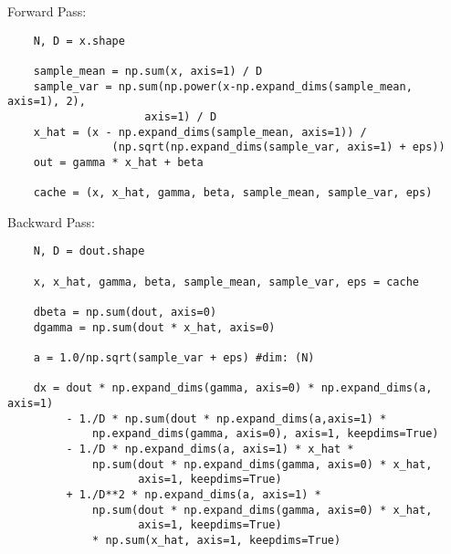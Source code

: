\documentclass[12pt,letter]{article}
\begin{document}
\begin{enumerate}
  \pagebreak

  Forward Pass:
\begin{verbatim}
    N, D = x.shape

    sample_mean = np.sum(x, axis=1) / D
    sample_var = np.sum(np.power(x-np.expand_dims(sample_mean, axis=1), 2),
                     axis=1) / D
    x_hat = (x - np.expand_dims(sample_mean, axis=1)) / 
                (np.sqrt(np.expand_dims(sample_var, axis=1) + eps))
    out = gamma * x_hat + beta

    cache = (x, x_hat, gamma, beta, sample_mean, sample_var, eps)
\end{verbatim}
  Backward Pass:
\begin{verbatim}
    N, D = dout.shape
      
    x, x_hat, gamma, beta, sample_mean, sample_var, eps = cache

    dbeta = np.sum(dout, axis=0)
    dgamma = np.sum(dout * x_hat, axis=0)
        
    a = 1.0/np.sqrt(sample_var + eps) #dim: (N)
    
    dx = dout * np.expand_dims(gamma, axis=0) * np.expand_dims(a, axis=1)
         - 1./D * np.sum(dout * np.expand_dims(a,axis=1) * 
             np.expand_dims(gamma, axis=0), axis=1, keepdims=True)
         - 1./D * np.expand_dims(a, axis=1) * x_hat * 
             np.sum(dout * np.expand_dims(gamma, axis=0) * x_hat,
                    axis=1, keepdims=True)
         + 1./D**2 * np.expand_dims(a, axis=1) * 
             np.sum(dout * np.expand_dims(gamma, axis=0) * x_hat, 
                    axis=1, keepdims=True) 
             * np.sum(x_hat, axis=1, keepdims=True)
\end{verbatim}

  \pagebreak
  

\end{enumerate}
\end{document}
